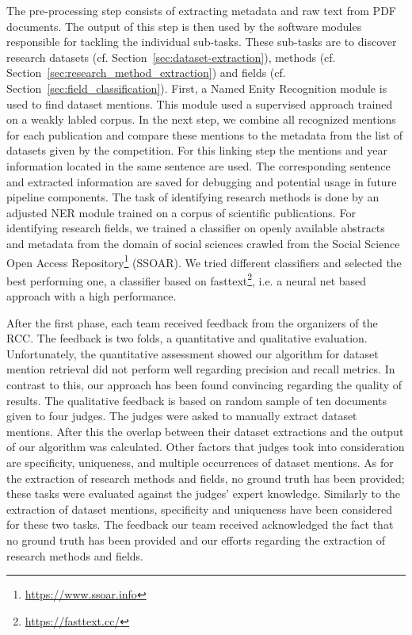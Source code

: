 The pre-processing step consists of extracting metadata and raw text from PDF documents.
The output of this step is then used by the software modules responsible for tackling the individual sub-tasks.
These sub-tasks are to discover research datasets (cf. Section~\ref{sec:dataset-extraction}), methods (cf. Section~\ref{sec:research_method_extraction}) and fields (cf. Section~\ref{sec:field_classification}).
First, a Named Enity Recognition module is used to find dataset mentions.
This module used a supervised approach trained on a weakly labled corpus.
In the next step, we combine all recognized mentions for each publication and compare these mentions to the metadata from the list of datasets given by the competition. %
For this linking step the mentions and year information located in the same sentence are used.
The corresponding sentence and extracted information are saved for debugging and potential usage in future pipeline components.
The task of identifying research methods is done by an adjusted NER module trained on a corpus of scientific publications. 
For identifying research fields, we trained a classifier on openly available abstracts and metadata from the domain of social sciences crawled from the Social Science Open Access Repository\footnote{\url{https://www.ssoar.info}} (SSOAR).
We tried different classifiers and selected the best performing one, a classifier based on fasttext\footnote{\url{https://fasttext.cc/}}, i.e. a neural net based approach with a high performance\cite{joulin2017bag}.



After the first phase, each team received feedback from the organizers of the RCC.
The feedback is two folds, a quantitative and qualitative evaluation.
Unfortunately, the quantitative assessment showed our algorithm for dataset mention retrieval did not perform well regarding precision and recall metrics.
In contrast to this, our approach has been found convincing regarding the quality of results.
The qualitative feedback is based on random sample of ten documents given to four judges.
The judges were asked to manually extract dataset mentions.
After this the overlap between their dataset extractions and the output of our algorithm was calculated.
Other factors that judges took into consideration are specificity, uniqueness, and multiple occurrences of dataset mentions.
As for the extraction of research methods and fields, no ground truth has been provided; these tasks were evaluated against the judges' expert knowledge.
Similarly to the extraction of dataset mentions, specificity and uniqueness have been considered for these two tasks.
The feedback our team received acknowledged the fact that no ground truth has been provided and our efforts regarding the extraction of research methods and fields.

